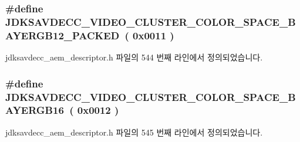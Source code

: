 \subsubsection[{\texorpdfstring{J\+D\+K\+S\+A\+V\+D\+E\+C\+C\+\_\+\+V\+I\+D\+E\+O\+\_\+\+C\+L\+U\+S\+T\+E\+R\+\_\+\+C\+O\+L\+O\+R\+\_\+\+S\+P\+A\+C\+E\+\_\+\+B\+A\+Y\+E\+R\+G\+B12\+\_\+\+P\+A\+C\+K\+ED}{JDKSAVDECC_VIDEO_CLUSTER_COLOR_SPACE_BAYERGB12_PACKED}}]{\setlength{\rightskip}{0pt plus 5cm}\#define J\+D\+K\+S\+A\+V\+D\+E\+C\+C\+\_\+\+V\+I\+D\+E\+O\+\_\+\+C\+L\+U\+S\+T\+E\+R\+\_\+\+C\+O\+L\+O\+R\+\_\+\+S\+P\+A\+C\+E\+\_\+\+B\+A\+Y\+E\+R\+G\+B12\+\_\+\+P\+A\+C\+K\+ED~( 0x0011 )}\hypertarget{group__video__cluster__color__space_ga0bbb5a259633146c6a4feddf5bdd4ac4}{}\label{group__video__cluster__color__space_ga0bbb5a259633146c6a4feddf5bdd4ac4}


jdksavdecc\+\_\+aem\+\_\+descriptor.\+h 파일의 544 번째 라인에서 정의되었습니다.

\subsubsection[{\texorpdfstring{J\+D\+K\+S\+A\+V\+D\+E\+C\+C\+\_\+\+V\+I\+D\+E\+O\+\_\+\+C\+L\+U\+S\+T\+E\+R\+\_\+\+C\+O\+L\+O\+R\+\_\+\+S\+P\+A\+C\+E\+\_\+\+B\+A\+Y\+E\+R\+G\+B16}{JDKSAVDECC_VIDEO_CLUSTER_COLOR_SPACE_BAYERGB16}}]{\setlength{\rightskip}{0pt plus 5cm}\#define J\+D\+K\+S\+A\+V\+D\+E\+C\+C\+\_\+\+V\+I\+D\+E\+O\+\_\+\+C\+L\+U\+S\+T\+E\+R\+\_\+\+C\+O\+L\+O\+R\+\_\+\+S\+P\+A\+C\+E\+\_\+\+B\+A\+Y\+E\+R\+G\+B16~( 0x0012 )}\hypertarget{group__video__cluster__color__space_ga3b1cbc6beacfba5e9cabe24fc736de5c}{}\label{group__video__cluster__color__space_ga3b1cbc6beacfba5e9cabe24fc736de5c}


jdksavdecc\+\_\+aem\+\_\+descriptor.\+h 파일의 545 번째 라인에서 정의되었습니다.

